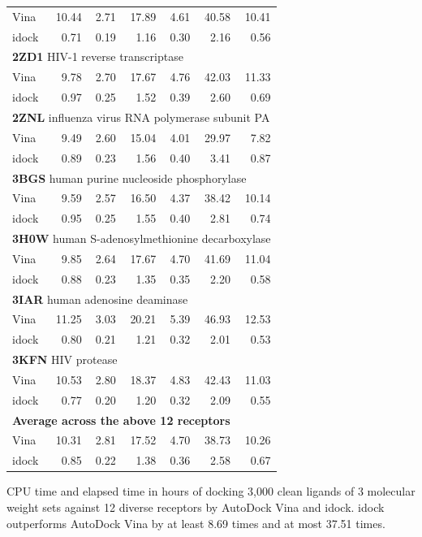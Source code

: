 \begin{table}
\begin{tabular}{lrrrrrr}
Vina  & 10.44 &  2.71 & 17.89 &  4.61 & 40.58 & 10.41\\
idock &  0.71 &  0.19 &  1.16 &  0.30 &  2.16 &  0.56\\
\multicolumn{7}{l}{\textbf{2ZD1} HIV-1 reverse transcriptase}\\
Vina  &  9.78 &  2.70 & 17.67 &  4.76 & 42.03 & 11.33\\
idock &  0.97 &  0.25 &  1.52 &  0.39 &  2.60 &  0.69\\
\multicolumn{7}{l}{\textbf{2ZNL} influenza virus RNA polymerase subunit PA}\\
Vina  &  9.49 &  2.60 & 15.04 &  4.01 & 29.97 &  7.82\\
idock &  0.89 &  0.23 &  1.56 &  0.40 &  3.41 &  0.87\\
\multicolumn{7}{l}{\textbf{3BGS} human purine nucleoside phosphorylase}\\
Vina  &  9.59 &  2.57 & 16.50 &  4.37 & 38.42 & 10.14\\
idock &  0.95 &  0.25 &  1.55 &  0.40 &  2.81 &  0.74\\
\multicolumn{7}{l}{\textbf{3H0W} human S-adenosylmethionine decarboxylase}\\
Vina  &  9.85 &  2.64 & 17.67 &  4.70 & 41.69 & 11.04\\
idock &  0.88 &  0.23 &  1.35 &  0.35 &  2.20 &  0.58\\
\multicolumn{7}{l}{\textbf{3IAR} human adenosine deaminase}\\
Vina  & 11.25 &  3.03 & 20.21 &  5.39 & 46.93 & 12.53\\
idock &  0.80 &  0.21 &  1.21 &  0.32 &  2.01 &  0.53\\
\multicolumn{7}{l}{\textbf{3KFN} HIV protease}\\
Vina  & 10.53 &  2.80 & 18.37 &  4.83 & 42.43 & 11.03\\
idock &  0.77 &  0.20 &  1.20 &  0.32 &  2.09 &  0.55\\
\multicolumn{7}{l}{\textbf{Average across the above 12 receptors}}\\
Vina  & 10.31 &  2.81 & 17.52 &  4.70 & 38.73 & 10.26\\
idock &  0.85 &  0.22 &  1.38 &  0.36 &  2.58 &  0.67\\
\end{tabular}
\begin{flushleft}
\label{istar:ExecutionTime} CPU time and elapsed time in hours of docking 3,000 clean ligands of 3 molecular weight sets against 12 diverse receptors by AutoDock Vina and idock. idock outperforms AutoDock Vina by at least 8.69 times and at most 37.51 times.
\end{flushleft}
\end{table}

